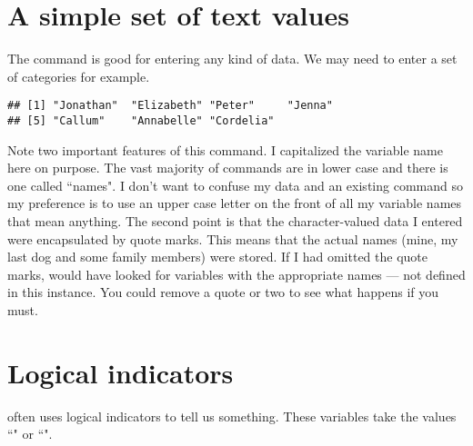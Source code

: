  
\section{A simple set of text values} 
 
The  command is good for entering any kind of data. We may need to enter a set of categories for example. 
\begin{knitrout}
\color{fgcolor}\begin{kframe}
\begin{alltt}
 \hlkwb{=} \hlstd{(}\hlstd{,} \hlstd{,} \hlstd{,} \hlstd{,} \hlstd{,} \hlstd{,} \hlstd{)}
\end{alltt}
\begin{verbatim}
## [1] "Jonathan"  "Elizabeth" "Peter"     "Jenna"    
## [5] "Callum"    "Annabelle" "Cordelia"
\end{verbatim}
\end{kframe}
\end{knitrout}
Note two important features of this command. I capitalized the variable name here on purpose. The vast majority of \R{} commands are in lower case and there is one called ``names". I don't want to confuse my data and an existing \R{} command so my preference is to use an upper case letter on the front of all my variable names that mean anything. The second point is that the character-valued data I entered were encapsulated by quote marks. This means that the actual names (mine, my last dog and some family members) were stored. If I had omitted the quote marks, \R{} would have looked for variables with the appropriate names --- not defined in this instance. You could remove a quote or two to see what happens if you must. 
 
\section{Logical indicators} 
 
\R{} often uses logical indicators to tell us something. These variables take the values ``" or ``". 
 
